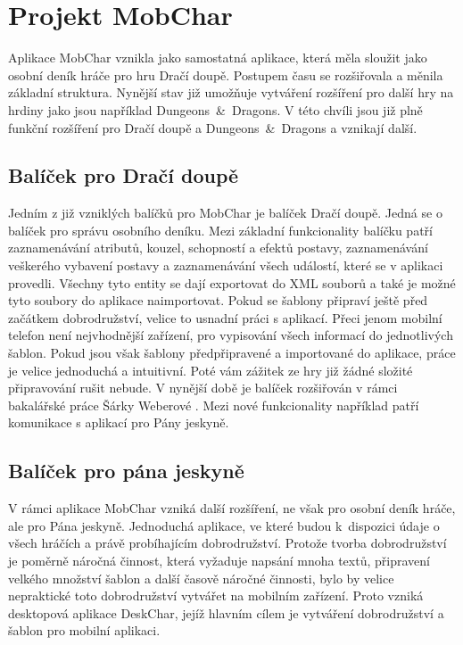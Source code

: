 \documentclass[thesis=B,czech]{resources/FITthesis}[2012/06/26]
\begin{document}
\section{Projekt MobChar}	
Aplikace MobChar vznikla jako samostatná aplikace, která měla sloužit jako osobní deník hráče pro hru Dračí doupě. Postupem času se rozšiřovala a měnila základní struktura. Nynější stav již umožňuje vytváření rozšíření pro další hry na hrdiny jako jsou například Dungeons~\&~Dragons. V této chvíli jsou již plně funkční rozšíření pro Dračí doupě a Dungeons~\&~Dragons a vznikají další.

\subsection{Balíček pro Dračí doupě}
Jedním z již vzniklých balíčků pro MobChar je balíček Dračí doupě. Jedná se o balíček pro správu  osobního deníku. Mezi základní funkcionality balíčku patří zaznamenávání atributů, kouzel, schopností a efektů postavy, zaznamenávání veškerého vybavení postavy a zaznamenávání všech událostí, které se v aplikaci provedli. Všechny tyto entity se dají exportovat do XML souborů a také je možné tyto soubory do aplikace naimportovat. Pokud se šablony připraví ještě před začátkem dobrodružství, velice to usnadní práci s aplikací. Přeci jenom mobilní telefon není nejvhodnější zařízení, pro vypisování všech informací do jednotlivých šablon. Pokud jsou však šablony předpřipravené a importované do aplikace, práce je velice jednoduchá a intuitivní. Poté vám zážitek ze hry již žádné složité připravování rušit nebude. V nynější době je balíček rozšiřován v rámci bakalářské práce Šárky Weberové \cite{Weberova_2017}. Mezi nové funkcionality například patří komunikace s aplikací pro Pány jeskyně.

\subsection{Balíček pro pána jeskyně}
V rámci aplikace MobChar vzniká další rozšíření, ne však pro osobní deník hráče, ale pro Pána jeskyně. Jednoduchá aplikace, ve které budou k~dispozici údaje o všech hráčích a právě probíhajícím dobrodružství. Protože tvorba dobrodružství je poměrně náročná činnost, která vyžaduje napsání mnoha textů, připravení velkého množství šablon a další časově náročné činnosti, bylo by velice nepraktické toto dobrodružství vytvářet na mobilním zařízení. Proto vzniká desktopová aplikace DeskChar, jejíž hlavním cílem je vytváření dobrodružství a šablon pro mobilní aplikaci.
\end{document}
